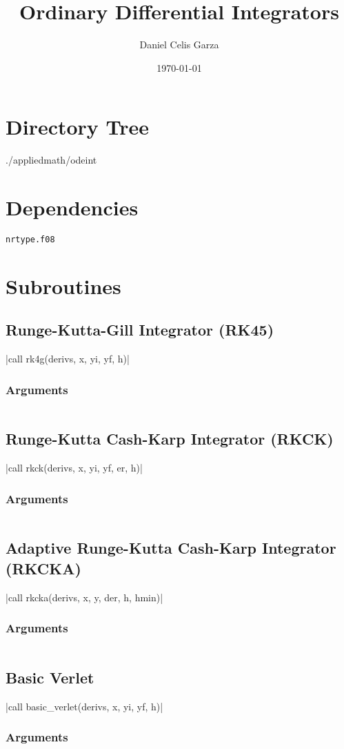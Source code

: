 \documentclass[11pt,a4paper]{article}
\title{Ordinary Differential Integrators}
\author{Daniel Celis Garza}
\date{\today}
\begin{document}
	\maketitle

	\section{Directory Tree}
		{\ubuntumono ./applied\textunderscore math/ode\textunderscore int}

	\section{Dependencies}
		\texttt{nrtype.f08}

	\section{Subroutines}
		\subsection{Runge-Kutta-Gill Integrator (RK45)}
			|call rk4g(derivs, x, yi, yf, h)|
			\subsubsection{Arguments}
				\inputminted[firstline=6, lastline=45]{fortran}{../ode.f08}
		\subsection{Runge-Kutta Cash-Karp Integrator (RKCK)}
			|call rkck(derivs, x, yi, yf, er, h)|
			\subsubsection{Arguments}
				\inputminted[firstline=67, lastline=123]{fortran}{../ode.f08}
		\subsection{Adaptive Runge-Kutta Cash-Karp Integrator (RKCKA)}
			|call rkcka(derivs, x, y, der, h, hmin)|
			\subsubsection{Arguments}
				\inputminted[firstline=249, lastline=282]{fortran}{../ode.f08}
		\subsection{Basic Verlet}
			|call basic_verlet(derivs, x, yi, yf, h)|
			\subsubsection{Arguments}
				\inputminted[firstline=295, lastline=328]{fortran}{../ode.f08}
\end{document}
